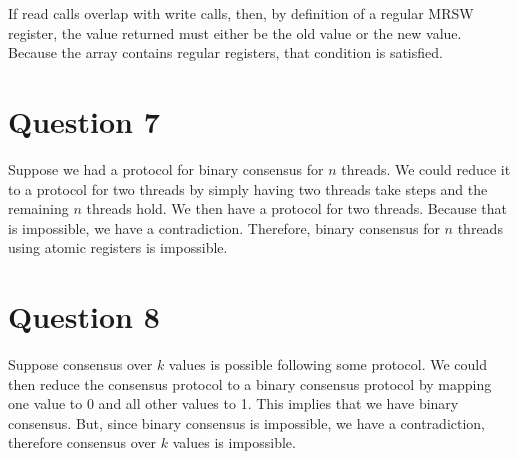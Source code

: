 \documentclass[11pt, letterpaper]{article}
\begin{document}
If read calls overlap with write calls, then, by definition of a regular MRSW register, the value returned must either be the old value or the new value. Because the array contains regular registers, that condition is satisfied.

\section*{Question 7}
\label{sec:question_7}

Suppose we had a protocol for binary consensus for $n$ threads. We could reduce it to a protocol for  two threads by simply having two threads take steps and the remaining $n$ threads hold. We then have a protocol for two threads. Because that is impossible, we have a contradiction. Therefore, binary consensus for $n$ threads using atomic registers is impossible.

\section*{Question 8}
\label{sec:question_8}

Suppose consensus over $k$ values is possible following some protocol. We could then reduce the consensus protocol to a binary consensus protocol by mapping one value to 0 and all other values to 1. This implies that we have binary consensus. But, since binary consensus is impossible, we have a contradiction, therefore consensus over $k$ values is impossible.
\end{document}
